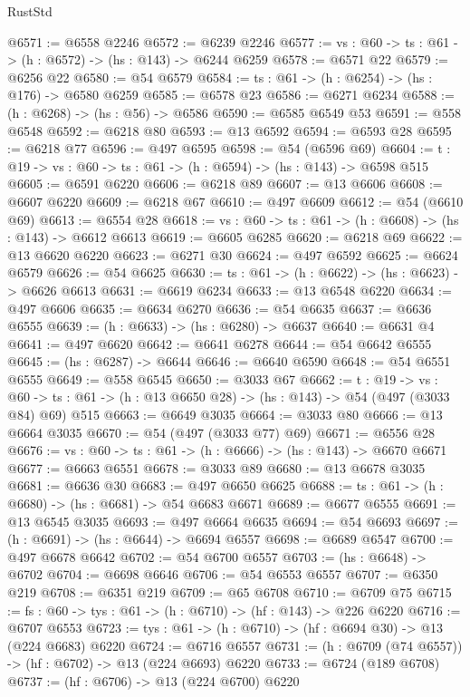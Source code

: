 \begin{lexlean}{RustStd}
\begin{coremodule}
@6571 := @6558 @2246
@6572 := @6239 @2246
@6577 := {vs : @60} -> {ts : @61} -> (h : @6572) -> (hs : @143) -> @6244 @6259
@6578 := @6571 @22
@6579 := @6256 @22
@6580 := @54 @6579
@6584 := {ts : @61} -> (h : @6254) -> (hs : @176) -> @6580 @6259
@6585 := @6578 @23
@6586 := @6271 @6234
@6588 := (h : @6268) -> (hs : @56) -> @6586
@6590 := @6585 @6549 @53
@6591 := @558 @6548
@6592 := @6218 @80
@6593 := @13 @6592
@6594 := @6593 @28
@6595 := @6218 @77
@6596 := @497 @6595
@6598 := @54 (@6596 @69)
@6604 := {t : @19} -> {vs : @60} -> {ts : @61} -> (h : @6594) -> (hs : @143) -> @6598 @515
@6605 := @6591 @6220
@6606 := @6218 @89
@6607 := @13 @6606
@6608 := @6607 @6220
@6609 := @6218 @67
@6610 := @497 @6609
@6612 := @54 (@6610 @69)
@6613 := @6554 @28
@6618 := {vs : @60} -> {ts : @61} -> (h : @6608) -> (hs : @143) -> @6612 @6613
@6619 := @6605 @6285
@6620 := @6218 @69
@6622 := @13 @6620 @6220
@6623 := @6271 @30
@6624 := @497 @6592
@6625 := @6624 @6579
@6626 := @54 @6625
@6630 := {ts : @61} -> (h : @6622) -> (hs : @6623) -> @6626 @6613
@6631 := @6619 @6234
@6633 := @13 @6548 @6220
@6634 := @497 @6606
@6635 := @6634 @6270
@6636 := @54 @6635
@6637 := @6636 @6555
@6639 := (h : @6633) -> (hs : @6280) -> @6637
@6640 := @6631 @4
@6641 := @497 @6620
@6642 := @6641 @6278
@6644 := @54 @6642 @6555
@6645 := (hs : @6287) -> @6644
@6646 := @6640 @6590
@6648 := @54 @6551 @6555
@6649 := @558 @6545
@6650 := @3033 @67
@6662 := {t : @19} ->
  {vs : @60} -> {ts : @61} -> (h : @13 @6650 @28) -> (hs : @143) -> @54 (@497 (@3033 @84) @69) @515
@6663 := @6649 @3035
@6664 := @3033 @80
@6666 := @13 @6664 @3035
@6670 := @54 (@497 (@3033 @77) @69)
@6671 := @6556 @28
@6676 := {vs : @60} -> {ts : @61} -> (h : @6666) -> (hs : @143) -> @6670 @6671
@6677 := @6663 @6551
@6678 := @3033 @89
@6680 := @13 @6678 @3035
@6681 := @6636 @30
@6683 := @497 @6650 @6625
@6688 := {ts : @61} -> (h : @6680) -> (hs : @6681) -> @54 @6683 @6671
@6689 := @6677 @6555
@6691 := @13 @6545 @3035
@6693 := @497 @6664 @6635
@6694 := @54 @6693
@6697 := (h : @6691) -> (hs : @6644) -> @6694 @6557
@6698 := @6689 @6547
@6700 := @497 @6678 @6642
@6702 := @54 @6700 @6557
@6703 := (hs : @6648) -> @6702
@6704 := @6698 @6646
@6706 := @54 @6553 @6557
@6707 := @6350 @219
@6708 := @6351 @219
@6709 := @65 @6708
@6710 := @6709 @75
@6715 := {fs : @60} -> {tys : @61} -> (h : @6710) -> (hf : @143) -> @226 @6220
@6716 := @6707 @6553
@6723 := {tys : @61} -> (h : @6710) -> (hf : @6694 @30) -> @13 (@224 @6683) @6220
@6724 := @6716 @6557
@6731 := (h : @6709 (@74 @6557)) -> (hf : @6702) -> @13 (@224 @6693) @6220
@6733 := @6724 (@189 @6708)
@6737 := (hf : @6706) -> @13 (@224 @6700) @6220

\end{coremodule}
\end{lexlean}

